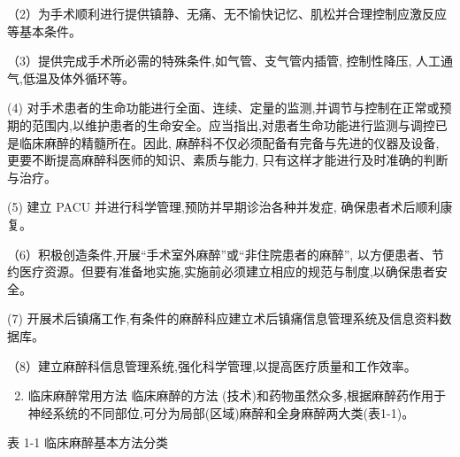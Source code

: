 \documentclass[10pt]{article}
\begin{document}
（2）为手术顺利进行提供镇静、无痛、无不愉快记忆、肌松并合理控制应激反应等基本条件。

（3）提供完成手术所必需的特殊条件,如气管、支气管内插管, 控制性降压, 人工通气,低温及体外循环等。

(4) 对手术患者的生命功能进行全面、连续、定量的监测,并调节与控制在正常或预期的范围内,以维护患者的生命安全。应当指出,对患者生命功能进行监测与调控已是临床麻醉的精髓所在。因此, 麻醉科不仅必须配备有完备与先进的仪器及设备, 更要不断提高麻醉科医师的知识、素质与能力, 只有这样才能进行及时准确的判断与治疗。

(5) 建立 PACU 并进行科学管理,预防并早期诊治各种并发症, 确保患者术后顺利康复。

（6）积极创造条件,开展“手术室外麻醉”或“非住院患者的麻醉”, 以方便患者、节约医疗资源。但要有准备地实施,实施前必须建立相应的规范与制度,以确保患者安全。

(7) 开展术后镇痛工作,有条件的麻醉科应建立术后镇痛信息管理系统及信息资料数据库。

（8）建立麻醉科信息管理系统,强化科学管理,以提高医疗质量和工作效率。

\begin{enumerate}
  \setcounter{enumi}{1}
  \item 临床麻醉常用方法 临床麻醉的方法 (技术)和药物虽然众多,根据麻醉药作用于神经系统的不同部位,可分为局部(区域)麻醉和全身麻醉两大类(表1-1)。
\end{enumerate}

表 1-1 临床麻醉基本方法分类
\end{document}
